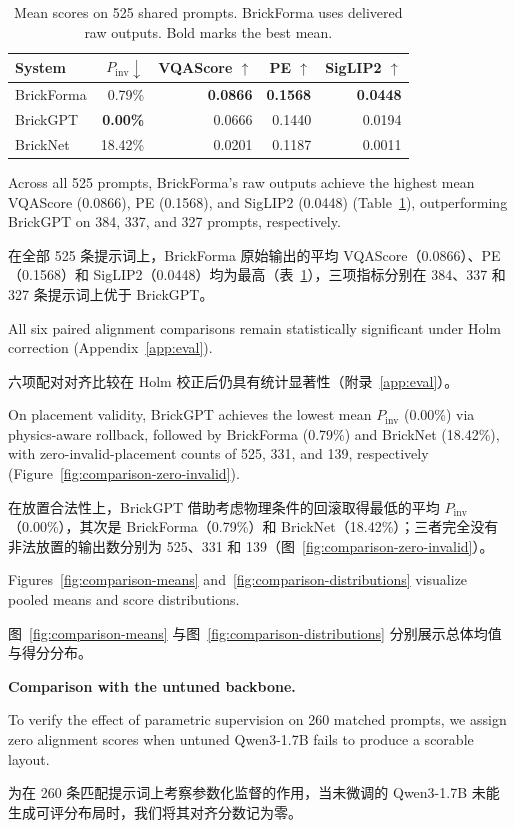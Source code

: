 \documentclass[11pt,letterpaper]{article}
\newcommand{\zh}[1]{{\chinesefont #1}}
\newcommand{\pair}[2]{\par\addvspace{4pt}\noindent
  \begin{minipage}{\linewidth}\raggedright
  #1\par\nobreak\vspace{1pt}
  {\color{translation}\chinesefont\fontsize{10.5}{15.3}\selectfont #2\par}
  \end{minipage}\par}
\newcommand{\readinghead}[2]{\par\addvspace{9pt}\noindent\textbf{#1}\enspace
  {\color{translation}\zh{#2}}\par\nobreak}
\begin{document}
\begin{table}[!htbp]
\centering\small
\setlength{\tabcolsep}{3pt}
\begin{tabular}{lrrrr}
\toprule
System & $P_{\mathrm{inv}}\downarrow$ & VQAScore $\uparrow$ & PE $\uparrow$ & SigLIP2 $\uparrow$ \\
\midrule
BrickForma & 0.79\% & \textbf{0.0866} & \textbf{0.1568} & \textbf{0.0448} \\
BrickGPT & \textbf{0.00\%} & 0.0666 & 0.1440 & 0.0194 \\
BrickNet & 18.42\% & 0.0201 & 0.1187 & 0.0011 \\
\bottomrule
\end{tabular}
\caption{Mean scores on 525 shared prompts. BrickForma uses delivered raw outputs. Bold marks the best mean.}
\label{tab:main}
\end{table}

\pair{Across all 525 prompts, BrickForma's raw outputs achieve the highest mean VQAScore (0.0866), PE (0.1568), and SigLIP2 (0.0448) (Table~\ref{tab:main}), outperforming BrickGPT on 384, 337, and 327 prompts, respectively.}{在全部 525 条提示词上，BrickForma 原始输出的平均 VQAScore（0.0866）、PE（0.1568）和 SigLIP2（0.0448）均为最高（表~\ref{tab:main}），三项指标分别在 384、337 和 327 条提示词上优于 BrickGPT。}

\pair{All six paired alignment comparisons remain statistically significant under Holm correction (Appendix~\ref{app:eval}).}{六项配对对齐比较在 Holm 校正后仍具有统计显著性（附录~\ref{app:eval}）。}

\pair{On placement validity, BrickGPT achieves the lowest mean $P_{\mathrm{inv}}$ (0.00\%) via physics-aware rollback, followed by BrickForma (0.79\%) and BrickNet (18.42\%), with zero-invalid-placement counts of 525, 331, and 139, respectively (Figure~\ref{fig:comparison-zero-invalid}).}{在放置合法性上，BrickGPT 借助考虑物理条件的回滚取得最低的平均 $P_{\mathrm{inv}}$（0.00\%），其次是 BrickForma（0.79\%）和 BrickNet（18.42\%）；三者完全没有非法放置的输出数分别为 525、331 和 139（图~\ref{fig:comparison-zero-invalid}）。}

\pair{Figures~\ref{fig:comparison-means} and~\ref{fig:comparison-distributions} visualize pooled means and score distributions.}{图~\ref{fig:comparison-means} 与图~\ref{fig:comparison-distributions} 分别展示总体均值与得分分布。}

\readinghead{Comparison with the untuned backbone.}{与未微调基座模型的比较}

\pair{To verify the effect of parametric supervision on 260 matched prompts, we assign zero alignment scores when untuned Qwen3-1.7B fails to produce a scorable layout.}{为在 260 条匹配提示词上考察参数化监督的作用，当未微调的 Qwen3-1.7B 未能生成可评分布局时，我们将其对齐分数记为零。}
\end{document}
